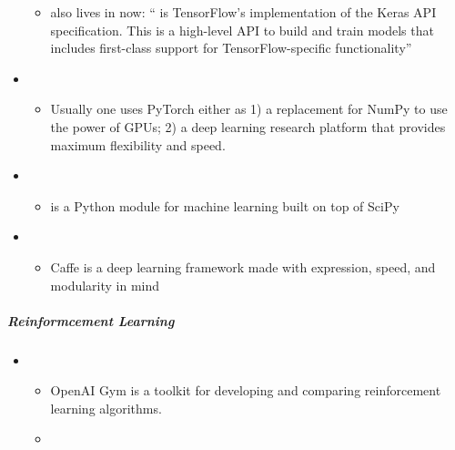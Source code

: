\documentclass[letterpaper,10pt,english]{sphinxmanual}
\begin{document}
\begin{itemize}
\begin{itemize}
\item {} 
 also lives in  now: “ is
TensorFlow’s implementation of the Keras API specification. This
is a high-level API to build and train models that includes
first-class support for TensorFlow-specific functionality”

\end{itemize}

\item {} 
\begin{itemize}
\item {} 
Usually one uses PyTorch either as 1) a replacement for NumPy to
use the power of GPUs; 2) a deep learning research platform that
provides maximum flexibility and speed.

\end{itemize}

\item {} 
\begin{itemize}
\item {} 
 is a Python module for machine learning built on
top of SciPy

\end{itemize}

\item {} 
\begin{itemize}
\item {} 
Caffe is a deep learning framework made with expression, speed,
and modularity in mind

\end{itemize}

\end{itemize}


\subparagraph{Reinformcement Learning}
\label{\detokenize{resource/research/machine_learning/machine_learning_tools:reinformcement-learning}}\begin{itemize}
\item {} 
\begin{itemize}
\item {} 
OpenAI Gym is a toolkit for developing and comparing reinforcement
learning algorithms.

\item {} 

\end{itemize}

\end{itemize}
\end{document}
